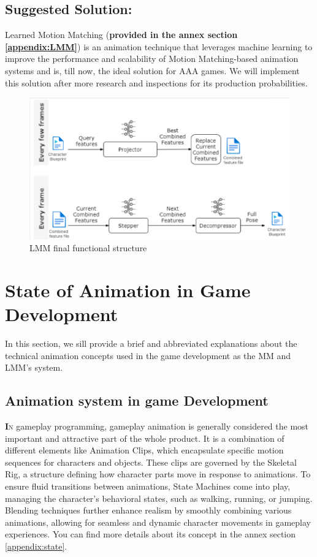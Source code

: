 \documentclass[12pt]{book}
\begin{document}
\subsection{Suggested Solution:}
Learned Motion Matching (\textbf{provided in the annex section \ref{appendix:LMM}}) is an animation technique that leverages machine learning to improve the performance and scalability of Motion Matching-based animation systems and is, till now, the ideal solution for AAA games. We will implement this solution after more research and inspections for its production probabilities.
 \begin{figure}[!h]
    \centering
    \includegraphics[scale=0.7]{./Figures/finalLMM.PNG}
    \caption{LMM final functional structure}
    \label{LMM final functional structure}
\end{figure}

\section{State of Animation in Game Development}
In this section, we sill provide a brief and abbreviated explanations about the technical animation concepts used in the game development as the MM and LMM's system.

\subsection{Animation system in game Development}
\lettrine[findent=1pt]{\textbf{I}}{n} gameplay programming, gameplay animation is generally considered the most important and attractive part of the whole product. It is a combination of different elements like Animation Clips, which encapsulate specific motion sequences for characters and objects. These clips are governed by the Skeletal Rig, a structure defining how character parts move in response to animations. To ensure fluid transitions between animations, State Machines come into play, managing the character's behavioral states, such as walking, running, or jumping. Blending techniques further enhance realism by smoothly combining various animations, allowing for seamless and dynamic character movements in gameplay experiences.
You can find more details about its concept in the annex section \ref{appendix:state}.
\end{document}
